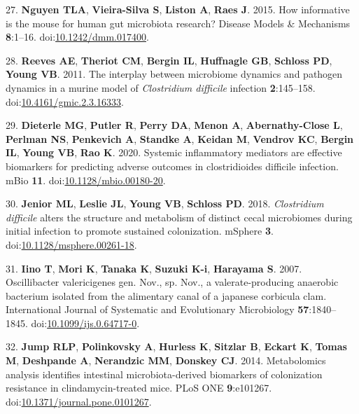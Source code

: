\documentclass[
  11pt,
]{article}
\begin{document}
\leavevmode\hypertarget{ref-Nguyen2015}{}%
27. \textbf{Nguyen TLA}, \textbf{Vieira-Silva S}, \textbf{Liston A},
\textbf{Raes J}. 2015. How informative is the mouse for human gut
microbiota research? Disease Models \& Mechanisms \textbf{8}:1--16.
doi:\href{https://doi.org/10.1242/dmm.017400}{10.1242/dmm.017400}.

\leavevmode\hypertarget{ref-Reeves2011}{}%
28. \textbf{Reeves AE}, \textbf{Theriot CM}, \textbf{Bergin IL},
\textbf{Huffnagle GB}, \textbf{Schloss PD}, \textbf{Young VB}. 2011. The
interplay between microbiome dynamics and pathogen dynamics in a murine
model of \emph{Clostridium difficile} infection \textbf{2}:145--158.
doi:\href{https://doi.org/10.4161/gmic.2.3.16333}{10.4161/gmic.2.3.16333}.

\leavevmode\hypertarget{ref-Dieterle2020}{}%
29. \textbf{Dieterle MG}, \textbf{Putler R}, \textbf{Perry DA},
\textbf{Menon A}, \textbf{Abernathy-Close L}, \textbf{Perlman NS},
\textbf{Penkevich A}, \textbf{Standke A}, \textbf{Keidan M},
\textbf{Vendrov KC}, \textbf{Bergin IL}, \textbf{Young VB}, \textbf{Rao
K}. 2020. Systemic inflammatory mediators are effective biomarkers for
predicting adverse outcomes in clostridioides difficile infection. mBio
\textbf{11}.
doi:\href{https://doi.org/10.1128/mbio.00180-20}{10.1128/mbio.00180-20}.

\leavevmode\hypertarget{ref-Jenior2018}{}%
30. \textbf{Jenior ML}, \textbf{Leslie JL}, \textbf{Young VB},
\textbf{Schloss PD}. 2018. \emph{Clostridium difficile} alters the
structure and metabolism of distinct cecal microbiomes during initial
infection to promote sustained colonization. mSphere \textbf{3}.
doi:\href{https://doi.org/10.1128/msphere.00261-18}{10.1128/msphere.00261-18}.

\leavevmode\hypertarget{ref-Iino2007}{}%
31. \textbf{Iino T}, \textbf{Mori K}, \textbf{Tanaka K}, \textbf{Suzuki
K-i}, \textbf{Harayama S}. 2007. Oscillibacter valericigenes gen. Nov.,
sp. Nov., a valerate-producing anaerobic bacterium isolated from the
alimentary canal of a japanese corbicula clam. International Journal of
Systematic and Evolutionary Microbiology \textbf{57}:1840--1845.
doi:\href{https://doi.org/10.1099/ijs.0.64717-0}{10.1099/ijs.0.64717-0}.

\leavevmode\hypertarget{ref-Jump2014}{}%
32. \textbf{Jump RLP}, \textbf{Polinkovsky A}, \textbf{Hurless K},
\textbf{Sitzlar B}, \textbf{Eckart K}, \textbf{Tomas M},
\textbf{Deshpande A}, \textbf{Nerandzic MM}, \textbf{Donskey CJ}. 2014.
Metabolomics analysis identifies intestinal microbiota-derived
biomarkers of colonization resistance in clindamycin-treated mice. PLoS
ONE \textbf{9}:e101267.
doi:\href{https://doi.org/10.1371/journal.pone.0101267}{10.1371/journal.pone.0101267}.
\end{document}
